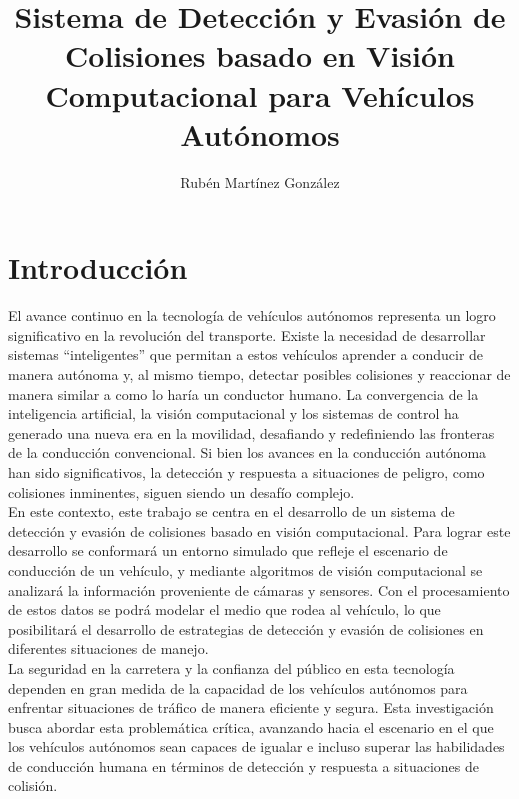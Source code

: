 \documentclass[10pt,letterpaper,final]{article}
\begin{document}
    \title{Sistema de Detección y Evasión de Colisiones basado en Visión Computacional para Vehículos Autónomos}
    \author{Rubén Martínez González}
    \maketitle
    \clearpage
    \section*{Introducción}
    \noindent
    El avance continuo en la tecnología de vehículos autónomos representa un logro significativo en la revolución del transporte.
    Existe la necesidad de desarrollar sistemas ``inteligentes'' que permitan a estos vehículos aprender a conducir de manera autónoma y,
    al mismo tiempo, detectar posibles colisiones y reaccionar de manera similar a como lo haría un conductor humano.
    La convergencia de la inteligencia artificial, la visión computacional y los sistemas de control ha generado una nueva era en la movilidad,
    desafiando y redefiniendo las fronteras de la conducción convencional.
    Si bien los avances en la conducción autónoma han sido significativos, la detección y respuesta a
    situaciones de peligro, como colisiones inminentes, siguen siendo un desafío complejo.\\ \newline
    En este contexto, este trabajo se centra en el desarrollo de un sistema de detección y evasión de colisiones basado en visión computacional.
    Para lograr este desarrollo se conformará un entorno simulado que refleje el escenario de conducción de un vehículo,
    y mediante algoritmos de visión computacional se analizará la información proveniente de cámaras y sensores.
    Con el procesamiento de estos datos se podrá modelar el medio que rodea al vehículo, lo que posibilitará
    el desarrollo de estrategias de detección y evasión de colisiones en diferentes situaciones de manejo.\\ \newline
    La seguridad en la carretera y la confianza del público en esta tecnología dependen en gran medida de la capacidad
    de los vehículos autónomos para enfrentar situaciones de tráfico de manera eficiente y segura.
    Esta investigación busca abordar esta problemática crítica, avanzando hacia el escenario en el que los vehículos autónomos
    sean capaces de igualar e incluso superar las habilidades de conducción humana en términos de detección y respuesta
    a situaciones de colisión.
    \clearpage
    
\end{document}
